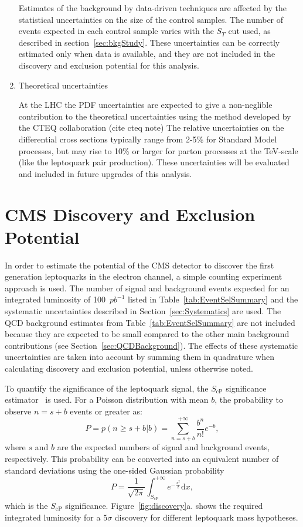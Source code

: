\documentclass{cmspaper}
\begin{document}
\begin{linenumbers}
\begin{enumerate}
Estimates of the background by data-driven techniques are affected by the statistical
uncertainties on the size of the control samples.
The number of events expected in each control sample varies with the $S_T$ cut used, as 
described in section~\ref{sec:bkgStudy}. These uncertainties can be correctly estimated 
only when data is available, and they are not included in the discovery and exclusion potential
for this analysis.
%
\item Theoretical uncertainties 

At the LHC the PDF uncertainties are expected to give a non-neglible
contribution to the theoretical uncertainties using the
method developed by the CTEQ collaboration (cite cteq note)
The relative uncertainties on the differential cross sections 
typically range from 2-5\% for Standard Model processes, 
but may rise to 10\% or larger for parton processes at the TeV-scale 
(like the leptoquark pair production).
These uncertainties will be evaluated and included in future upgrades of this analysis.
\end{enumerate}



\section{CMS Discovery and Exclusion Potential} \label{CMSpotential}

In order to estimate the potential of the CMS detector to discover the first generation leptoquarks
in the electron channel, a simple counting experiment approach is used. 
The number of signal and background events expected for an integrated luminosity of
100~$pb^{-1}$ listed in Table~\ref{tab:EventSelSummary} and the systematic uncertainties described 
in Section~\ref{sec:Systematics} are used. 
The QCD background estimates from Table~\ref{tab:EventSelSummary} 
are not included because they are expected to be 
small compared to the other main background contributions (see Section~\ref{sec:QCDBackground}).
The effects of these systematic uncertainties are taken into account
by summing them in quadrature when calculating discovery and exclusion potential, unless otherwise noted.


To quantify the significance of the
leptoquark signal, the 
$S_\text{cP}$ significance estimator~\cite{ref:scp} is used.  
For a Poisson distribution
with mean $b$,
the probability to observe $n=s+b$ events or greater as:
\begin{equation}
P = p(n\geq s+b|b) = \sum_{n=s+b}^{+\infty} \frac{b^n}{n!}e^{-b},
\end{equation}
where $s$ and $b$ are the expected numbers of signal and background events, respectively. This probability can be
converted into an equivalent number of standard deviations using the one-sided Gaussian probability
\begin{equation}
P = \frac{1}{\sqrt{2\pi}}\int_{S_\text{cP}}^{+\infty} e^{-\frac{x^2}{2}}\mathrm{d}x,
\label{eq:ScP}
\end{equation}
which is the $S_\text{cP}$ significance.
Figure~\ref{fig:discovery}a. shows the required integrated luminosity
for a $5\sigma$ discovery for different leptoquark mass hypotheses. 


\end{linenumbers}
\end{document}

